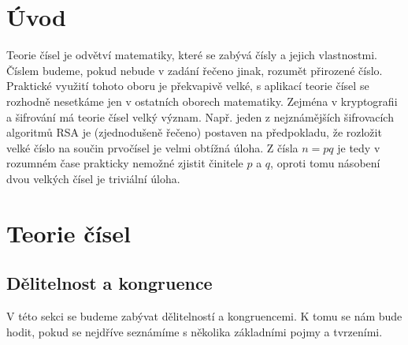 \documentclass[12pt,a4paper]{report}
\begin{document}


\tableofcontents

\chapter{Úvod}

Teorie čísel je odvětví matematiky, které se zabývá čísly a jejich vlastnostmi. Číslem budeme, pokud nebude v zadání řečeno jinak, rozumět přirozené číslo. 
\\  Praktické využití tohoto oboru je překvapivě velké, s aplikací teorie čísel se rozhodně nesetkáme jen v ostatních oborech matematiky. Zejména v kryptografii a šifrování má teorie čísel velký význam.	Např. jeden z nejznámějších šifrovacích algoritmů RSA je (zjednodušeně řečeno) postaven na předpokladu, že rozložit velké číslo na součin prvočísel je velmi obtížná úloha. Z čísla $n = pq$ je tedy v rozumném čase prakticky nemožné zjistit činitele $p$ a $q$, oproti tomu násobení dvou velkých čísel je triviální úloha.

\chapter{Teorie čísel} %


\section{Dělitelnost a kongruence}
V této sekci se budeme zabývat dělitelností a kongruencemi. K tomu se nám bude hodit, pokud se nejdříve seznámíme s několika základními pojmy a tvrzeními. 
\end{document}

